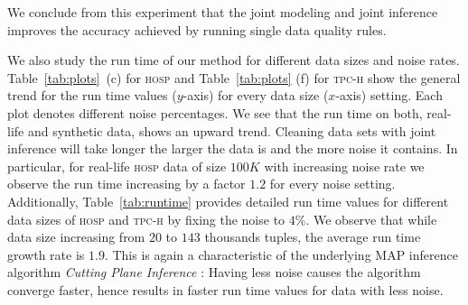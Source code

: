 We conclude from this experiment that the joint modeling and joint inference improves the accuracy achieved by running single data quality rules.

We also study the run time of our method for different data sizes and noise rates. Table~\ref{tab:plots}~(c) for \textsc{hosp} and Table~\ref{tab:plots} (f) for \textsc{tpc-h} show the general trend for the run time values ($y$-axis) for every data size ($x$-axis) setting. Each plot denotes different noise percentages. We see that the run time on both, real-life and synthetic data, shows an upward trend. Cleaning data sets with joint inference will take longer the larger the data is and the more noise it contains. In particular, for real-life \textsc{hosp} data of size $100K$ with increasing noise rate we observe the run time increasing by a factor $1.2$ for every noise setting. 
Additionally, Table~\ref{tab:runtime} provides detailed run time values for different data sizes of \textsc{hosp} and \textsc{tpc-h} by fixing the noise to $4\%$. We observe that while data size increasing from $20$ to $143$ thousands tuples, the average run time growth rate is $1.9$. 
This is again a characteristic of the underlying MAP inference algorithm \textit{Cutting Plane Inference} \cite{riedel08improving}: Having less noise causes the algorithm converge faster, hence results in faster run time values for data with less noise. %


